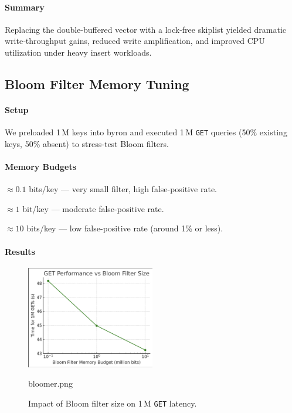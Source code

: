 \documentclass[10pt]{article}
\begin{document}
\paragraph{Summary}
Replacing the double-buffered vector with a lock-free skiplist yielded dramatic write‐throughput gains, reduced write amplification, and improved CPU utilization under heavy insert workloads.  

\subsection{Bloom Filter Memory Tuning}

\paragraph{Setup}
We preloaded 1\,M keys into byron and executed 1\,M \texttt{GET} queries (50\% existing keys, 50\% absent) to stress-test Bloom filters.

\paragraph{Memory Budgets}
\begin{description}[leftmargin=1em,labelwidth=*,itemsep=0.5ex]
  \item[100\,K bits] $\approx0.1$ bits/key — very small filter, high false-positive rate.
  \item[1\,M bits] $\approx1$ bit/key — moderate false-positive rate.
  \item[10\,M bits] $\approx10$ bits/key — low false-positive rate (around 1\% or less).
\end{description}

\paragraph{Results}
\begin{figure}[htbp]
  \centering
  \includegraphics[width=0.5\textwidth]{bloomer.png}
  \caption{Impact of Bloom filter size on 1\,M \texttt{GET} latency.}
  \label{fig:bloom_tuning}bloomer.png
\end{figure}
\end{document}
